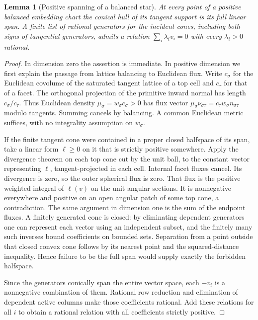 \documentclass[11pt]{article}
\newtheorem{lemma}[theorem]{Lemma}
\theoremstyle{definition}\newtheorem{definition}[theorem]{Definition}
\theoremstyle{remark}\newtheorem{remark}[theorem]{Remark}
\begin{document}
\begin{lemma}[Positive spanning of a balanced star]\label{lem:star}
At every point of a positive balanced embedding chart the conical hull of its tangent support is its full linear span. A finite list of rational generators for the incident cones, including both signs of tangential generators, admits a relation $\sum_i\lambda_i v_i=0$ with every $\lambda_i>0$ rational.
\end{lemma}
\begin{proof}
In dimension zero the assertion is immediate. In positive dimension we first explain the passage from lattice balancing to Euclidean flux. Write $c_\sigma$ for the Euclidean covolume of the saturated tangent lattice of a top cell and $c_\tau$ for that of a facet. The orthogonal projection of the primitive inward normal has length $c_\sigma/c_\tau$. Thus Euclidean density $\mu_\sigma=w_\sigma c_\sigma>0$ has flux vector $\mu_\sigma\nu_{\sigma\tau}=c_\tau w_\sigma n_{\sigma\tau}$ modulo tangents. Summing cancels by balancing. A common Euclidean metric suffices, with no integrality assumption on $w_\sigma$.

If the finite tangent cone were contained in a proper closed halfspace of its span, take a linear form $\ell\geq0$ on it that is strictly positive somewhere. Apply the divergence theorem on each top cone cut by the unit ball, to the constant vector representing $\ell$, tangent-projected in each cell. Internal facet fluxes cancel. Its divergence is zero, so the outer spherical flux is zero. That flux is the positive weighted integral of $\ell(v)$ on the unit angular sections. It is nonnegative everywhere and positive on an open angular patch of some top cone, a contradiction. The same argument in dimension one is the sum of the endpoint fluxes. A finitely generated cone is closed: by eliminating dependent generators one can represent each vector using an independent subset, and the finitely many such inverses bound coefficients on bounded sets. Separation from a point outside that closed convex cone follows by its nearest point and the squared-distance inequality. Hence failure to be the full span would supply exactly the forbidden halfspace.

Since the generators conically span the entire vector space, each $-v_i$ is a nonnegative combination of them. Rational row reduction and elimination of dependent active columns make those coefficients rational. Add these relations for all $i$ to obtain a rational relation with all coefficients strictly positive.
\end{proof}
\end{document}
